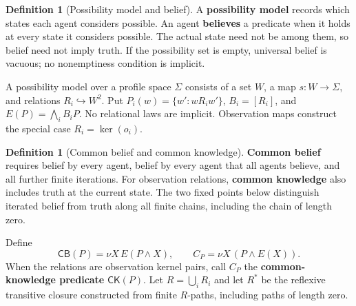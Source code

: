 \documentclass[11pt,a4paper]{article}
\numberwithin{equation}{section}
\theoremstyle{definition}
\newtheorem{definition}[theorem]{Definition}
\theoremstyle{remark}
\theoremstyle{plain}
\begin{document}
\begin{definition}[Possibility model and belief]
\label{def:egt-possibility-model-and-belief}
A \textbf{possibility model} records which states each agent considers
possible. An agent \textbf{believes} a predicate when it holds at every
state it considers possible. The actual state need not be among them, so
belief need not imply truth. If the possibility set is empty, universal
belief is vacuous; no nonemptiness condition is implicit.

A possibility model over a profile space $\Sigma$ consists of a set $W$,
a map $s:W\to\Sigma$, and relations $R_i\hookrightarrow W^2$.
Put $P_i(w)=\{w':wR_iw'\}$, $B_i=[R_i]$, and
$E(P)=\bigwedge_iB_iP$.
No relational laws are implicit. Observation maps construct the special
case $R_i=\ker(o_i)$.
\end{definition}

\begin{definition}[Common belief and common knowledge]
\label{def:egt-common-belief-and-common-knowledge}
\textbf{Common belief} requires belief by every agent, belief by every
agent that all agents believe, and all further finite iterations.
For observation relations, \textbf{common knowledge} also includes truth at
the current state. The two fixed points below distinguish iterated belief
from truth along all finite chains, including the chain of length zero.

Define
\begin{equation}\label{eq:egt-common-belief}
 \mathsf{CB}(P)=\nu X\,E(P\wedge X),
 \qquad C_P=\nu X\,(P\wedge E(X)).
\end{equation}
When the relations are observation kernel pairs, call $C_P$ the
\textbf{common-knowledge predicate} $\mathsf{CK}(P)$.
Let $R=\bigcup_iR_i$ and let $R^*$ be the reflexive transitive closure
constructed from finite $R$-paths, including paths of length zero.
\end{definition}
\end{document}
